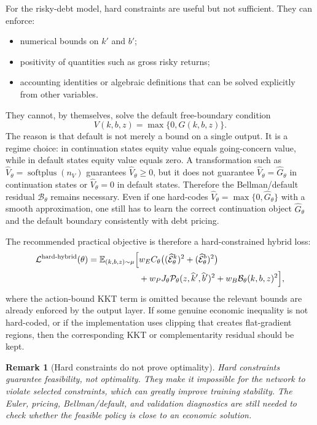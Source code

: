 \documentclass[11pt]{article}
\newtheorem{remark}{Remark}
\newcommand{\E}{\mathbb{E}}
\newcommand{\1}{\mathbf{1}}
\begin{document}
For the risky-debt model, hard constraints are useful but not sufficient. They
can enforce:
\begin{itemize}[leftmargin=2em]
  \item numerical bounds on \(k'\) and \(b'\);
  \item positivity of quantities such as gross risky returns;
  \item accounting identities or algebraic definitions that can be solved
  explicitly from other variables.
\end{itemize}
They cannot, by themselves, solve the default free-boundary condition
\[
  V(k,b,z)=\max\{0,G(k,b,z)\}.
\]
The reason is that default is not merely a bound on a single output. It is a
regime choice: in continuation states equity value equals going-concern value,
while in default states equity value equals zero. A transformation such as
\(\widehat V_\theta=\operatorname{softplus}(n_V)\) guarantees
\(\widehat V_\theta\ge0\), but it does not guarantee
\(\widehat V_\theta=\widehat G_\theta\) in continuation states or
\(\widehat V_\theta=0\) in default states. Therefore the Bellman/default
residual \(\mathcal B_\theta\) remains necessary. Even if one hard-codes
\(\widehat V_\theta=\max\{0,\widehat G_\theta\}\) with a smooth approximation,
one still has to learn the correct continuation object \(\widehat G_\theta\) and
the default boundary consistently with debt pricing.

The recommended practical objective is therefore a hard-constrained hybrid
loss:
\begin{align}
  \mathcal L^{\mathrm{hard\text{-}hybrid}}(\theta)
  =
  \E_{(k,b,z)\sim\mu}
  \Big[
    &w_E C_\theta
      \big((\widehat{\mathcal E}^k_\theta)^2
      +(\widehat{\mathcal E}^b_\theta)^2\big) \notag\\
    &+w_PJ_\theta
      \mathcal P_\theta(z,\widehat k',\widehat b')^2
      +w_B\mathcal B_\theta(k,b,z)^2
  \Big],
  \label{eq:hard-hybrid-objective}
\end{align}
where the action-bound KKT term is omitted because the relevant bounds are
already enforced by the output layer. If some genuine economic inequality is not
hard-coded, or if the implementation uses clipping that creates flat-gradient
regions, then the corresponding KKT or complementarity residual should be kept.

\begin{remark}[Hard constraints do not prove optimality]
\label{rem:hard-constraints-not-optimality}
Hard constraints guarantee feasibility, not optimality. They make it impossible
for the network to violate selected constraints, which can greatly improve
training stability. The Euler, pricing, Bellman/default, and validation
diagnostics are still needed to check whether the feasible policy is close to an
economic solution.
\end{remark}
\end{document}
